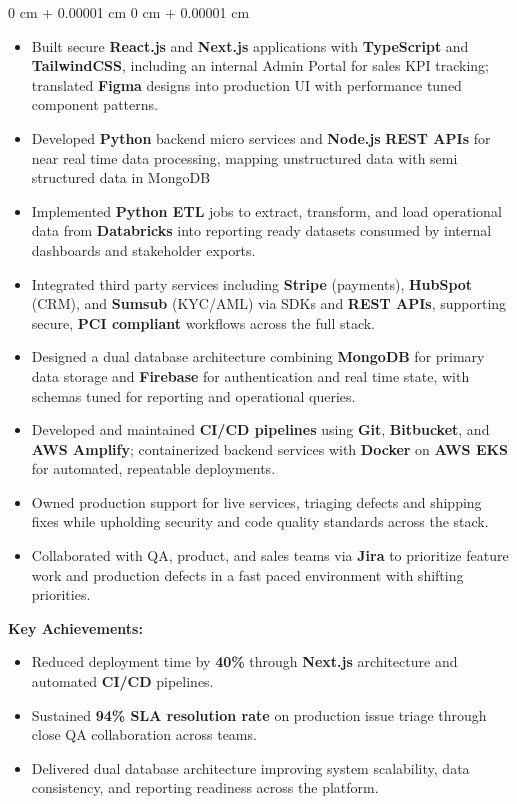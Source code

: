 \documentclass[10pt, letterpaper]{article}
\newenvironment{highlights}{
    \begin{itemize}[
        topsep=0.10 cm,
        parsep=0.10 cm,
        partopsep=0pt,
        itemsep=0pt,
        leftmargin=0 cm + 10pt
    ]
}{
    \end{itemize}
} %
\newenvironment{highlightsforbulletentries}{
    \begin{itemize}[
        topsep=0.10 cm,
        parsep=0.10 cm,
        partopsep=0pt,
        itemsep=0pt,
        leftmargin=10pt
    ]
}{
    \end{itemize}
} %
\newenvironment{onecolentry}{
    \begin{adjustwidth}{
        0 cm + 0.00001 cm
    }{
        0 cm + 0.00001 cm
    }
}{
    \end{adjustwidth}
} %
\begin{document}
\begin{onecolentry}
\begin{highlights}
	\item Built secure \textbf{React.js} and \textbf{Next.js} applications with \textbf{TypeScript} and \textbf{TailwindCSS}, including an internal Admin Portal for sales KPI tracking; translated \textbf{Figma} designs into production UI with performance tuned component patterns.
	\item Developed \textbf{Python} backend micro services and \textbf{Node.js} \textbf{REST APIs} for near real time data processing, mapping unstructured data with semi structured data in MongoDB
	\item Implemented \textbf{Python ETL} jobs to extract, transform, and load operational data from \textbf{Databricks} into reporting ready datasets consumed by internal dashboards and stakeholder exports.
	\item Integrated third party services including \textbf{Stripe} (payments), \textbf{HubSpot} (CRM), and \textbf{Sumsub} (KYC/AML) via SDKs and \textbf{REST APIs}, supporting secure, \textbf{PCI compliant} workflows across the full stack.
	\item Designed a dual database architecture combining \textbf{MongoDB} for primary data storage and \textbf{Firebase} for authentication and real time state, with schemas tuned for reporting and operational queries.
	\item Developed and maintained \textbf{CI/CD pipelines} using \textbf{Git}, \textbf{Bitbucket}, and \textbf{AWS Amplify}; containerized backend services with \textbf{Docker} on \textbf{AWS EKS} for automated, repeatable deployments.
	\item Owned production support for live services, triaging defects and shipping fixes while upholding security and code quality standards across the stack.
	\item Collaborated with QA, product, and sales teams via \textbf{Jira} to prioritize feature work and production defects in a fast paced environment with shifting priorities.
\end{highlights}

\textbf{Key Achievements:}
\begin{highlightsforbulletentries}
	\item Reduced deployment time by \textbf{40\%} through \textbf{Next.js} architecture and automated \textbf{CI/CD} pipelines.
	\item Sustained \textbf{94\% SLA resolution rate} on production issue triage through close QA collaboration across teams.
	\item Delivered dual database architecture improving system scalability, data consistency, and reporting readiness across the platform.
\end{highlightsforbulletentries}
\end{onecolentry}
\end{document}
